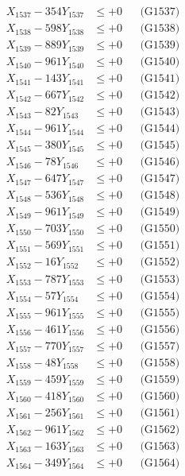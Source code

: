 \documentclass[a4paper,10pt]{article}
\begin{document}
{\begin{align}
X_{1537} - 354Y_{1537} &\leq +0 && \text{(G1537)} \\
X_{1538} - 598Y_{1538} &\leq +0 && \text{(G1538)} \\
X_{1539} - 889Y_{1539} &\leq +0 && \text{(G1539)} \\
X_{1540} - 961Y_{1540} &\leq +0 && \text{(G1540)} \\
\allowbreak
X_{1541} - 143Y_{1541} &\leq +0 && \text{(G1541)} \\
X_{1542} - 667Y_{1542} &\leq +0 && \text{(G1542)} \\
X_{1543} - 82Y_{1543} &\leq +0 && \text{(G1543)} \\
X_{1544} - 961Y_{1544} &\leq +0 && \text{(G1544)} \\
X_{1545} - 380Y_{1545} &\leq +0 && \text{(G1545)} \\
X_{1546} - 78Y_{1546} &\leq +0 && \text{(G1546)} \\
X_{1547} - 647Y_{1547} &\leq +0 && \text{(G1547)} \\
X_{1548} - 536Y_{1548} &\leq +0 && \text{(G1548)} \\
X_{1549} - 961Y_{1549} &\leq +0 && \text{(G1549)} \\
X_{1550} - 703Y_{1550} &\leq +0 && \text{(G1550)} \\
\allowbreak
X_{1551} - 569Y_{1551} &\leq +0 && \text{(G1551)} \\
X_{1552} - 16Y_{1552} &\leq +0 && \text{(G1552)} \\
X_{1553} - 787Y_{1553} &\leq +0 && \text{(G1553)} \\
X_{1554} - 57Y_{1554} &\leq +0 && \text{(G1554)} \\
X_{1555} - 961Y_{1555} &\leq +0 && \text{(G1555)} \\
X_{1556} - 461Y_{1556} &\leq +0 && \text{(G1556)} \\
X_{1557} - 770Y_{1557} &\leq +0 && \text{(G1557)} \\
X_{1558} - 48Y_{1558} &\leq +0 && \text{(G1558)} \\
X_{1559} - 459Y_{1559} &\leq +0 && \text{(G1559)} \\
X_{1560} - 418Y_{1560} &\leq +0 && \text{(G1560)} \\
\allowbreak
X_{1561} - 256Y_{1561} &\leq +0 && \text{(G1561)} \\
X_{1562} - 961Y_{1562} &\leq +0 && \text{(G1562)} \\
X_{1563} - 163Y_{1563} &\leq +0 && \text{(G1563)} \\
X_{1564} - 349Y_{1564} &\leq +0 && \text{(G1564)} \\

\end{align}}
\end{document}
